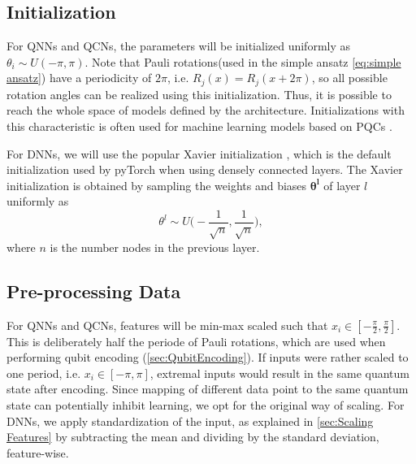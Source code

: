 \subsection{Initialization}\label{sec:Initialization}
For QNNs and QCNs, the parameters will be initialized uniformly as $\theta_i \sim U(-\pi, \pi)$. Note that Pauli rotations(used in the simple ansatz \autoref{eq:simple ansatz}) have a periodicity of $2\pi$, i.e. $R_j(x) = R_j(x+2\pi)$, so all possible rotation angles can be realized using this initialization. Thus, it is possible to reach the whole space of models defined by the architecture. Initializations with this characteristic is often used for machine learning models based on PQCs \cite{abbas2020power, skolik2020layerwise}.

For DNNs, we will use the popular Xavier initialization \cite{xavier}, which is the default initialization used by pyTorch\cite{pytorch} when using densely connected layers. The Xavier initialization is obtained by sampling the weights and biases $\boldsymbol{\theta^{l}}$ of layer $l$ uniformly as 
\begin{equation}
    \theta^{l} \sim U\big(-\frac{1}{\sqrt{n}},\frac{1}{\sqrt{n}}\big),
\end{equation}
where $n$ is the number nodes in the previous layer. 

\subsection{Pre-processing Data}\label{sec:Pre-processing Input}
For QNNs and QCNs, features will be min-max scaled such that $x_i \in [-\frac{\pi}{2}, \frac{\pi}{2}]$. This is deliberately half the periode of Pauli rotations, which are used when performing qubit encoding (\autoref{sec:QubitEncoding}). If inputs were rather scaled to one period, i.e. $x_i \in [-\pi, \pi]$, extremal inputs would result in the same quantum state after encoding. Since mapping of different data point to the same quantum state can potentially inhibit learning, we opt for the original way of scaling. 
For DNNs, we apply standardization of the input, as explained in \autoref{sec:Scaling Features} by subtracting the mean and dividing by the standard deviation, feature-wise.

